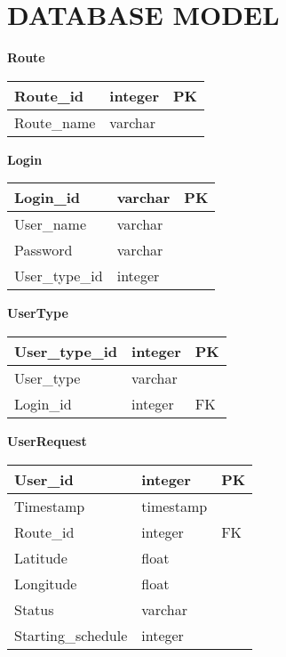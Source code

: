 \section{DATABASE MODEL}
\setlength{\parindent}{0em}
\textbf{Route}
\begin{table}[H]
	\centering
	\begin{tabular}{| m{4cm} | m{4cm} | m{4cm} |}
		\hline
		Route\_id & integer & PK\\
		\hline
		Route\_name & varchar & \\
		\hline
	\end{tabular}
\end{table}
\textbf{Login}
\begin{table}[H]
	\centering
	\begin{tabular}{| m{4cm} | m{4cm} | m{4cm} |}
		\hline
		Login\_id & varchar & PK\\
		\hline
		User\_name & varchar & \\
		\hline
		Password & varchar & \\
		\hline
		User\_type\_id & integer & \\
		\hline
	\end{tabular}
\end{table}
\textbf{UserType}
\begin{table}[H]
	\centering
	\begin{tabular}{| m{4cm} | m{4cm} | m{4cm} |}
		\hline
		User\_type\_id & integer & PK\\
		\hline
		User\_type & varchar & \\
		\hline
		Login\_id & integer & FK\\
		\hline
	\end{tabular}
\end{table}
\textbf{UserRequest}
\begin{table}[H]
	\centering
	\begin{tabular}{| m{4cm} | m{4cm} | m{4cm} |}
		\hline
		User\_id & integer & PK\\
		\hline
		Timestamp & timestamp & \\
		\hline
		Route\_id & integer & FK\\
		\hline
		Latitude & float & \\
		\hline
		Longitude & float & \\
		\hline
		Status & varchar & \\
		\hline
		Starting\_schedule & integer & \\
		\hline
	\end{tabular}
\end{table}
